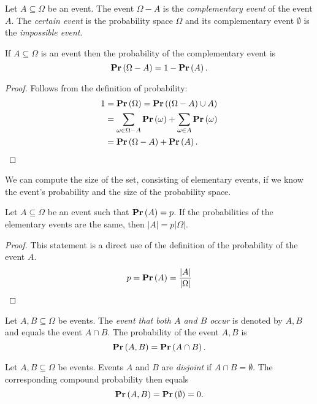 \begin{definition}
Let $A \subseteq \Omega$ be an event. The event $\Omega - A$ is the \emph{complementary event} of the event $A$. The \emph{certain event} is the probability space $\Omega$ and its complementary event $\emptyset$ is the \emph{impossible event}.
\end{definition}

\begin{corollary}
If $A \subseteq \Omega$ is an event then the probability of the complementary event is 
\[ 
	\mathbf{Pr}\left(\Omega - A\right) = 1 - \mathbf{Pr}\left(A\right) \text{.} 
\] 
\end{corollary}
\begin{proof}
Follows from the definition of probability:
\[
\begin{split}
1 
	& = \mathbf{Pr}\left(\Omega\right) = \mathbf{Pr}\left((\Omega - A) \cup A\right) \\
	& = \displaystyle\sum_{\omega \in \Omega - A} \mathbf{Pr}\left(\omega\right) + \displaystyle\sum_{\omega \in A} \mathbf{Pr}\left(\omega\right) \\
	& = \mathbf{Pr}\left(\Omega - A\right) + \mathbf{Pr}\left(A\right) \text{.}
\end{split}
\]
\end{proof}

We can compute the size of the set, consisting of elementary events, if we know the event's probability and the size of the probability space.

\begin{lemma}
Let $A \subseteq \Omega$ be an event such that $\mathbf{Pr}\left(A\right) = p$. If the probabilities of the elementary events are the same, then $|A| = p |\Omega|$.
\end{lemma}
\begin{proof}
This statement is a direct use of the definition of the probability of the event $A$.
\[
p = \mathbf{Pr}\left(A\right) = \frac{|A|}{|\Omega|}
\]
\end{proof}

\begin{definition}[Intersection]
Let $A, B \subseteq \Omega$ be events. The \emph{event that both $A$ and $B$ occur} is denoted by $A, B$ and equals the event $A \cap B$. The probability of the event $A, B$ is
\[
\mathbf{Pr}\left(A, B\right) = \mathbf{Pr}\left(A \cap B\right) \text{.}
\]
\end{definition}

\begin{definition}
Let $A, B \subseteq \Omega$ be events. Events $A$ and $B$ are \emph{disjoint} if $A \cap B = \emptyset$. The corresponding compound probability then equals
\[
\mathbf{Pr}\left(A, B\right) = \mathbf{Pr}\left(\emptyset\right) = 0 \text{.}
\]
\end{definition}

